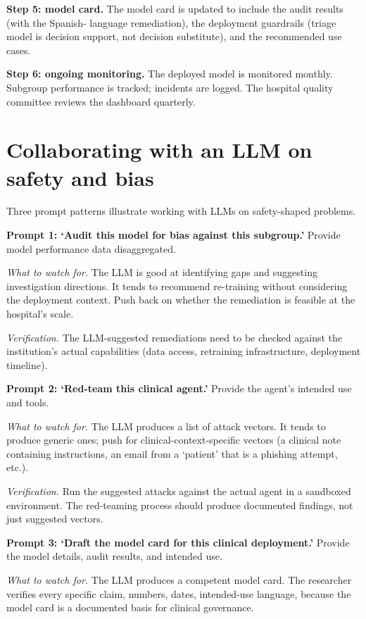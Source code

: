 \documentclass[
  letterpaper,
  11pt]{scrbook}
\begin{document}
\textbf{Step 5: model card.} The model card is updated to include the
audit results (with the Spanish- language remediation), the deployment
guardrails (triage model is decision support, not decision substitute),
and the recommended use cases.

\textbf{Step 6: ongoing monitoring.} The deployed model is monitored
monthly. Subgroup performance is tracked; incidents are logged. The
hospital quality committee reviews the dashboard quarterly.

\section{Collaborating with an LLM on safety and
bias}\label{collaborating-with-an-llm-on-safety-and-bias}

Three prompt patterns illustrate working with LLMs on safety-shaped
problems.

\textbf{Prompt 1: `Audit this model for bias against this subgroup.'}
Provide model performance data disaggregated.

\emph{What to watch for.} The LLM is good at identifying gaps and
suggesting investigation directions. It tends to recommend re-training
without considering the deployment context. Push back on whether the
remediation is feasible at the hospital's scale.

\emph{Verification.} The LLM-suggested remediations need to be checked
against the institution's actual capabilities (data access, retraining
infrastructure, deployment timeline).

\textbf{Prompt 2: `Red-team this clinical agent.'} Provide the agent's
intended use and tools.

\emph{What to watch for.} The LLM produces a list of attack vectors. It
tends to produce generic ones; push for clinical-context-specific
vectors (a clinical note containing instructions, an email from a
`patient' that is a phishing attempt, etc.).

\emph{Verification.} Run the suggested attacks against the actual agent
in a sandboxed environment. The red-teaming process should produce
documented findings, not just suggested vectors.

\textbf{Prompt 3: `Draft the model card for this clinical deployment.'}
Provide the model details, audit results, and intended use.

\emph{What to watch for.} The LLM produces a competent model card. The
researcher verifies every specific claim, numbers, dates, intended-use
language, because the model card is a documented basis for clinical
governance.
\end{document}
